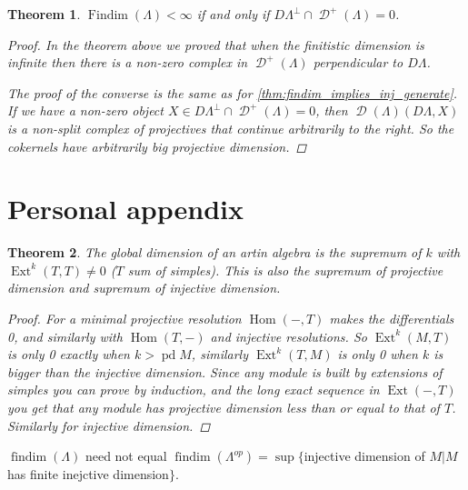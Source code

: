 \documentclass[11pt, a4paper, english]{article}
\newtheorem{theorem}{Theorem}[section]
\theoremstyle{definition}
\DeclareMathOperator{\Hom}{Hom}
\DeclareMathOperator{\Ext}{Ext}
\DeclareMathOperator{\findim}{findim}
\DeclareMathOperator{\Findim}{Findim}
\DeclareMathOperator{\pd}{pd}
\DeclareMathOperator{\D}{\mathcal{D}}
\begin{document}
\begin{theorem}\cite[Theorem~4.4]{Rick19}
	$\Findim(\Lambda) < \infty$ if and only if $D\Lambda^\perp \cap \D^+(\Lambda) = 0$.
	\begin{proof}
		In the theorem above we proved that when the finitistic dimension is infinite then there is a non-zero complex in $\D^+(\Lambda)$ perpendicular to $D\Lambda$. 
		
		The proof of the converse is the same as for \cref{thm:findim_implies_inj_generate}. If we have a non-zero object $X \in D\Lambda^\perp \cap \D^+(\Lambda) = 0$, then $\D(\Lambda)(D\Lambda, X)$ is a non-split complex of projectives that continue arbitrarily to the right. So the cokernels have arbitrarily big projective dimension.
	\end{proof}
\end{theorem}

\section{Personal appendix}
\begin{theorem}
	The global dimension of an artin algebra is the supremum of $k$ with $\Ext^k(T,T)\neq 0$ ($T$ sum of simples). This is also the supremum of projective dimension and supremum of injective dimension.
	\begin{proof}
		For a minimal projective resolution $\Hom(-,T)$ makes the differentials 0, and similarly with $\Hom(T,-)$ and injective resolutions. So $\Ext^k(M, T)$ is only 0 exactly when $k>\pd M$, similarly $\Ext^k(T,M)$ is only 0 when $k$ is bigger than the injective dimension. Since any module is built by extensions of simples you can prove by induction, and the long exact sequence in $\Ext(-,T)$ you get that any module has projective dimension less than or equal to that of $T$. Similarly for injective dimension.
	\end{proof}
\end{theorem}

$\findim(\Lambda)$ need not equal $\findim(\Lambda^{op}) = \sup\{ $injective dimension of $M | M$ has finite inejctive dimension$ \}$.
\end{document}

